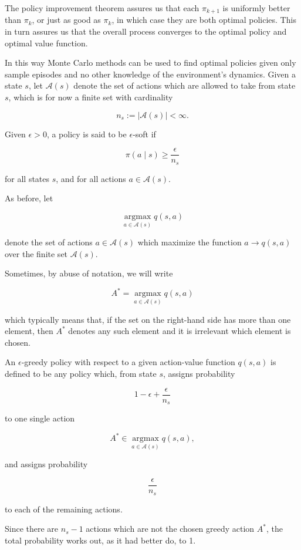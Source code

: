 \documentclass[11pt]{article}
\theoremstyle{plain} %
\theoremstyle{remark}
\begin{document}
 The policy improvement theorem assures us that each $\pi_{k+1}$ is
        uniformly better than $\pi_{k}$, or just as good as $\pi_{k}$, in which case
        they are both optimal policies. This in turn assures us that the overall process converges to the
        optimal policy and optimal value function.

In this way Monte Carlo methods can be used to find optimal policies
        given only sample episodes and no other knowledge of the environment's
        dynamics. Given a state $s$, let $\mathcal{A}(s)$ denote the set of actions
        which are allowed to take from state $s$, which is for now a finite set with
        cardinality

$$
  n_{s}:=|\mathcal{A}(s)|<\infty .
$$

 Given $\epsilon>0$, a policy is said to be $\epsilon$-soft if 

$$
  \pi(a \mid s) \geq \frac{\epsilon}{n_{s}}
$$

for all states $s$, and for all actions $a \in \mathcal{A}(s)$.

 As before, let

$$
  \underset{a \in \mathcal{A}(s)}{\operatorname{argmax}} q(s, a)
$$

denote the set of actions $a \in \mathcal{A}(s)$ which maximize the function
$a \rightarrow q(s, a)$ over the finite set $\mathcal{A}(s)$.

 Sometimes, by abuse of notation, we will write 

$$
  A^{*}=\underset{a \in \mathcal{A}(s)}{\operatorname{argmax}} q(s, a)
$$

which typically means that, if the set on the right-hand side has more than
one element, then $A^{*}$ denotes any such element and it is irrelevant which
element is chosen.

An $\epsilon$-greedy policy with respect to a given action-value
        function $q(s, a)$ is defined to be any policy which, from state $s$,
        assigns probability 

$$
  1-\epsilon+\frac{\epsilon}{n_{s}}
$$

to one single action

$$
  A^{*} \in \underset{a \in \mathcal{A}(s)}{\operatorname{argmax}} q(s, a),
$$

and assigns probability

$$
  \frac{\epsilon}{n_{s}}
$$

to each of the remaining actions.

Since there are $n_{s}-1$ actions which are not the chosen greedy
        action $A^{*}$, the total probability works out, as it had better do, to 1. 
\end{document}
